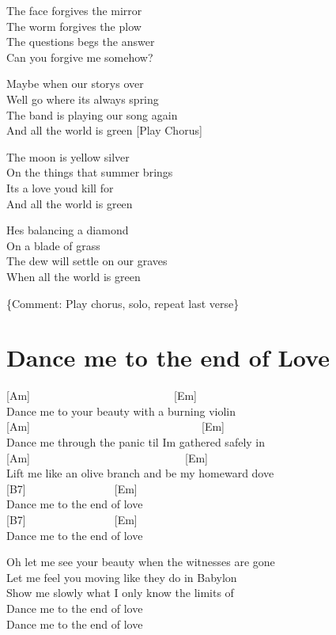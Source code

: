 \documentclass[
  letterpaper,
  a5paper]{memoir}
\begin{document}
The face forgives the mirror\\
The worm forgives the plow\\
The questions begs the answer\\
Can you forgive me somehow?

Maybe when our story\textquotesingle s over\\
We\textquotesingle ll go where it\textquotesingle s always spring\\
The band is playing our song again\\
And all the world is green {[}Play Chorus{]}

The moon is yellow silver\\
On the things that summer brings\\
It\textquotesingle s a love you\textquotesingle d kill for\\
And all the world is green

He\textquotesingle s balancing a diamond\\
On a blade of grass\\
The dew will settle on our graves\\
When all the world is green

\{Comment: Play chorus, solo, repeat last verse\}

\hypertarget{dance-me-to-the-end-of-love}{%
\chapter{Dance me to the end of
Love}\label{dance-me-to-the-end-of-love}}

{[}Am{]}~~~~~~~~~~~~~~~~~~~~~~~~~~{[}Em{]}\\
Dance me to your beauty with a burning violin\\
{[}Am{]}~~~~~~~~~~~~~~~~~~~~~~~~~~~~~~~{[}Em{]}\\
Dance me through the panic \textquotesingle til I\textquotesingle m
gathered safely in\\
{[}Am{]}~~~~~~~~~~~~~~~~~~~~~~~~~~~~{[}Em{]}\\
Lift me like an olive branch and be my homeward dove\\
{[}B7{]}~~~~~~~~~~~~~~~~{[}Em{]}\\
Dance me to the end of love\\
{[}B7{]}~~~~~~~~~~~~~~~~{[}Em{]}\\
Dance me to the end of love

Oh let me see your beauty when the witnesses are gone\\
Let me feel you moving like they do in Babylon\\
Show me slowly what I only know the limits of\\
Dance me to the end of love\\
Dance me to the end of love
\end{document}
